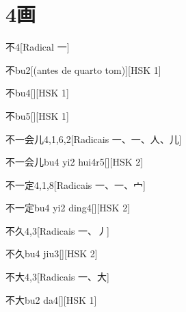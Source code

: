 
\section*{4画}

\begin{entry}{不}{4}[Radical ⼀]
  \begin{phonetics}{不}{bu2}[(antes de quarto tom)][HSK 1]
  \end{phonetics}
  \begin{phonetics}{不}{bu4}[][HSK 1]
  \end{phonetics}
  \begin{phonetics}{不}{bu5}[][HSK 1]
  \end{phonetics}
\end{entry}

\begin{entry}{不一会儿}{4,1,6,2}[Radicais ⼀、⼀、⼈、⼉]
  \begin{phonetics}{不一会儿}{bu4 yi2 hui4r5}[][HSK 2]
  \end{phonetics}
\end{entry}

\begin{entry}{不一定}{4,1,8}[Radicais ⼀、⼀、⼧]
  \begin{phonetics}{不一定}{bu4 yi2 ding4}[][HSK 2]
  \end{phonetics}
\end{entry}

\begin{entry}{不久}{4,3}[Radicais ⼀、⼃]
  \begin{phonetics}{不久}{bu4 jiu3}[][HSK 2]
  \end{phonetics}
\end{entry}

\begin{entry}{不大}{4,3}[Radicais ⼀、⼤]
  \begin{phonetics}{不大}{bu2 da4}[][HSK 1]
  \end{phonetics}
\end{entry}

